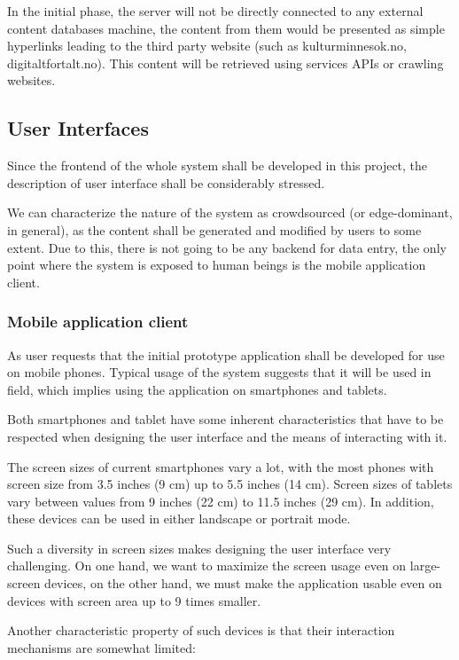 \documentclass[11pt]{book}
\begin{document}
In the initial phase, the server will not be directly connected to any external content databases machine, the content from them would be presented as simple hyperlinks leading to the third party website (such as kulturminnesok.no, digitaltfortalt.no). This content will be retrieved using services APIs or crawling websites.

\subsection{User Interfaces}
Since the frontend of the whole system shall be developed in this project, the description of user interface shall be considerably stressed.

We can characterize the nature of the system as crowdsourced (or edge-dominant, in general), as the content shall be generated and modified by users to some extent. Due to this, there is not going to be any backend for data entry, the only point where the system is exposed to human beings is the mobile application client.

\subsubsection{Mobile application client}\label{sec:req_webapplication_frontend}
As user requests that the initial prototype application shall be developed for use on mobile phones. Typical usage of the system suggests that it will be used in field, which implies using the application on smartphones and tablets.

Both smartphones and tablet have some inherent characteristics that have to be respected when designing the user interface and the means of interacting with it.

The screen sizes of current smartphones vary a lot, with the most phones with screen size from 3.5 inches (9 cm) up to 5.5 inches (14 cm). Screen sizes of tablets vary between values from 9 inches (22 cm) to 11.5 inches (29 cm). In addition, these devices can be used in either landscape or portrait mode.

Such a diversity in screen sizes makes designing the user interface very challenging. On one hand, we want to maximize the screen usage even on large-screen devices, on the other hand, we must make the application usable even on devices with screen area up to 9 times smaller.

Another characteristic property of such devices is that their interaction mechanisms are somewhat limited:
\end{document}
